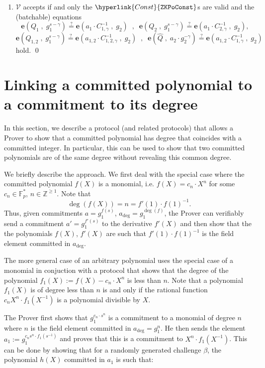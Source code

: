 \documentclass[11pt, lettersize, notitlepage, leqno, footskip=0.6cm]{article}
\newcommand{\bz}{\mathbb Z}
\newcommand{\bFp}{\mathbb{F}_p}
\newcommand{\mc}{\mathcal}
\newcommand{\mbf}{\mathbf}
\newcommand{\be}{\beta}
\newcommand{\what}{\widehat}
\newcommand{\V}{\mc{V}}
\newcommand{\vs}{\vspace{-0.15cm}}
\newcommand{\sta}{\stackrel{?}{=}}
\newcommand{\e}{\mbf{e}}
\numberwithin{equation}{section}
\begin{document}
\begin{mdframed}
\begin{enumerate}[wide, labelwidth=!, labelindent=0pt, itemsep=-0.2ex]
\item $\V$ accepts if and only the $\hyperlink{Const}{\tt{ZKPoConst}}$s are valid and the (batchable) equations \vs $$ \e(Q_1\;,\;g_1^{s-\gamma})\sta \e(a_1\cdot C_{1,\gamma}^{-1}\;,\;g_2)\;\;,\;\;\e(Q_2\;,\;g_1^{s-\gamma})\sta \e(a_1\cdot C_{2,\gamma}^{-1}\;,\;g_2),$$  \vspace{-3mm}  $$\e(Q_{1,2}\;,\;g_1^{s-\gamma})\sta \e(a_{1,2}\cdot C_{1,2,\gamma}^{-1}\;,\;g_2)\;\;,\;\;\e(\what{Q}\;,\;a_2\cdot g_2^{-\gamma})\sta \e(a_{1,2}\cdot C_{1,\gamma}^{-1}\;,\;g_2 )  $$ hold. \qed \end{enumerate} \end{mdframed}


\section{\fontsize{11}{11}\selectfont Linking a committed polynomial to a commitment to its degree}


In this section, we describe a protocol (and related protocols) that allows a Prover to show that a committed polynomial has degree that coincides with a committed integer. In particular, this can be used to show that two committed polynomials are of the same degree without revealing this common degree.

We briefly describe the approach. We first deal with the special case where the committed polynomial $f(X)$ is a monomial, i.e. $f(X) = c_n\cdot X^n$ for some $c_n\in \bFp^*$, $n\in\bz^{\geq 1}$. Note that \vs $$\deg(f(X)) = n = f'(1)\cdot f(1)^{-1}.$$ Thus, given commitments $a = g_1^{f(s)}$, $a_{\deg}= g_1^{\deg(f)}$, the Prover can verifiably send a commitment $a' = g_1^{f'(s)}$ to the derivative $f'(X)$ and then show that the the polynomials $f(X)$, $f'(X)$ are such that $f'(1)\cdot f(1)^{-1}$ is the field element committed in $a_{\deg}$.

The more general case of an arbitrary polynomial uses the special case of a monomial in conjuction with a protocol that shows that the degree of the polynomial $f_1(X):= f(X)-c_n\cdot X^n$ is less than $n$. Note that a polynomial $f_1(X)$ is of degree less than $n$ is and only if the rational function $c_n X^n\cdot f_1(X^{-1})$ is a polynomial divisible by $X$.

The Prover first shows that $g_1^{c_n \cdot s^n}$ is a commitment to a monomial of degree $n$ where $n$ is the field element committed in $a_{\deg} = g_1^n$. He then sends the element $a_1:= g_1^{c_n s^n\cdot f_1(s^{-1})}$ and proves that this is a commitment to $X^n \cdot f_1(X^{-1})$. This can be done by showing that for a randomly generated challenge $\be$, the polynomial $h(X)$ committed in $a_1$ is such that: \vspace{2mm}
\end{document}
